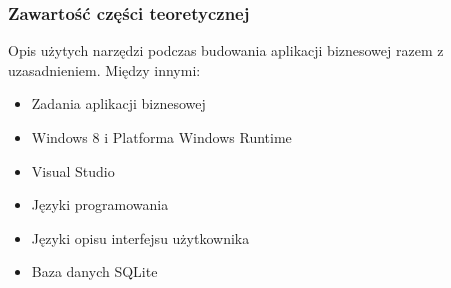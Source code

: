 \begin{frame}
\frametitle{Zawartość części teoretycznej}
Opis użytych narzędzi podczas budowania aplikacji biznesowej razem z uzasadnieniem.
Między innymi:
\begin{itemize}
\item Zadania aplikacji biznesowej
\item Windows 8 i Platforma Windows Runtime
\item Visual Studio
\item Języki programowania
\item Języki opisu interfejsu użytkownika
\item Baza danych SQLite
\end{itemize}
\end{frame}





